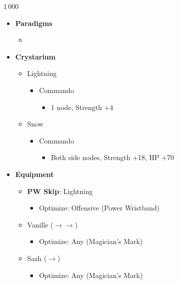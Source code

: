 \begin{multicols}{2}
\begin{shop}{1\,000}
\begin{itemize}
\begin{itemize}
    \end{itemize}
\end{itemize}
\end{shop}
\begin{menu}
\begin{itemize}
    \item \textbf{Paradigms}
    \begin{itemize}
        \item {}%
{\paradigmline{(\rav)}{\rav}{\rav}}%
{\paradigmline{\com}{\sen}{\med}}%
{\paradigmline[3]{\textit{[\com]}}{\textit{\com}}{\textit{\rav}}}%
{\paradigmline{[\com]}{\com}{\rav}}
    \end{itemize}
    \item \textbf{Crystarium}
    \begin{itemize}
        \item Lightning
        \begin{itemize}
            \item Commando
            \begin{itemize}
                \item 1 node, Strength +4
            \end{itemize}
        \end{itemize}
        \item Snow
        \begin{itemize}
            \item Commando
            \begin{itemize}
                \item Both side nodes, Strength +18, HP +70
            \end{itemize}
        \end{itemize}
    \end{itemize}
    
    \item \textbf{Equipment}
    \begin{itemize}
        \item {\bf PW Skip}: Lightning
        \begin{itemize}
            \item Optimize: Offensive (Power Wristband)
        \end{itemize}
        \item Vanille ($\rightarrow \rightarrow$)
        \begin{itemize}
            \item Optimize: Any (Magician's Mark)
        \end{itemize}
        \item Sazh ($\rightarrow$)
        \begin{itemize}
            \item Optimize: Any (Magician's Mark)
        \end{itemize}
    \end{itemize}
\end{itemize}
\end{menu}
\renewcommand{\first}{[1] Tri-Disaster (\rav/\rav/\rav)}


\end{multicols}
